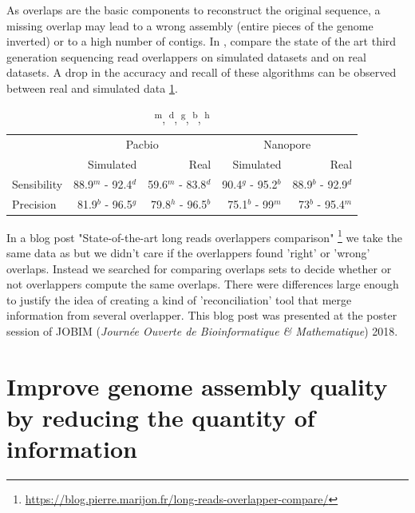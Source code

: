 \documentclass[main.tex]{subfiles}
\begin{document}
As overlaps are the basic components to reconstruct the original sequence, a missing overlap may lead to a wrong assembly (entire pieces of the genome inverted) or to a high number of contigs. In \cite{ovl_bench}, \citeauthor{ovl_bench} compare the state of the art third generation sequencing read overlappers on simulated datasets and on real datasets. A drop in the accuracy and recall of these algorithms can be observed between real and simulated data \ref{preassembly:tab:ovl_result}.
\begin{table}[ht]
    \centering
    \begin{tabular}{l|rr|rr}
                & \multicolumn{2}{c}{Pacbio}                & \multicolumn{2}{c}{Nanopore}              \\ 
                & Simulated           & Real                & Simulated         & Real                  \\ \hline
    Sensibility & 88.9$^m$ - 92.4$^d$ & 59.6$^m$ - 83.8$^d$ & 90.4$^g$ - 95.2$^b$ & 88.9$^b$ - 92.9$^d$ \\
    Precision   & 81.9$^b$ - 96.5$^g$ & 79.8$^h$ - 96.5$^b$ & 75.1$^b$ - 99$^m$   & 73$^b$ - 95.4$^m$   \\
    \end{tabular}
    \caption{\textsuperscript{m}, \textsuperscript{d}, \textsuperscript{g}, \textsuperscript{b}, \textsuperscript{h}\mhap}
    \label{preassembly:tab:ovl_result}
\end{table}

In a blog post "State-of-the-art long reads overlappers comparison" \footnote{\url{https://blog.pierre.marijon.fr/long-reads-overlapper-compare/}} we take the same data as \cite{ovl_bench} but we didn't care if the overlappers found 'right' or 'wrong' overlaps. Instead we searched for comparing overlaps sets to decide whether or not overlappers compute the same overlaps. There were differences large enough to justify the idea of creating a kind of 'reconciliation' tool that merge information from several overlapper. This blog post was presented at the poster session of JOBIM (\textit{Journée Ouverte de Bioinformatique \& Mathematique}) 2018.




\section{Improve genome assembly quality by reducing the quantity of information} \label{sec:preasm:intro_fpa}
\end{document}
